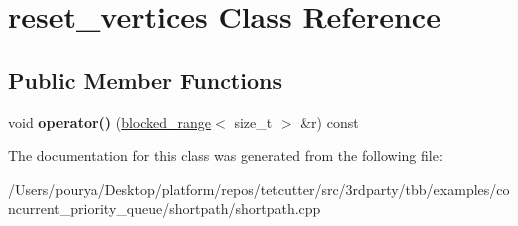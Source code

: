 \hypertarget{classreset__vertices}{}\section{reset\+\_\+vertices Class Reference}
\label{classreset__vertices}
\subsection*{Public Member Functions}
\begin{DoxyCompactItemize}
\item 
\hypertarget{classreset__vertices_a761dba809823c0191ab4c76d5ccc9fa4}{}void {\bfseries operator()} (\hyperlink{classtbb_1_1blocked__range}{blocked\+\_\+range}$<$ size\+\_\+t $>$ \&r) const \label{classreset__vertices_a761dba809823c0191ab4c76d5ccc9fa4}

\end{DoxyCompactItemize}


The documentation for this class was generated from the following file\+:\begin{DoxyCompactItemize}
\item 
/\+Users/pourya/\+Desktop/platform/repos/tetcutter/src/3rdparty/tbb/examples/concurrent\+\_\+priority\+\_\+queue/shortpath/shortpath.\+cpp\end{DoxyCompactItemize}
